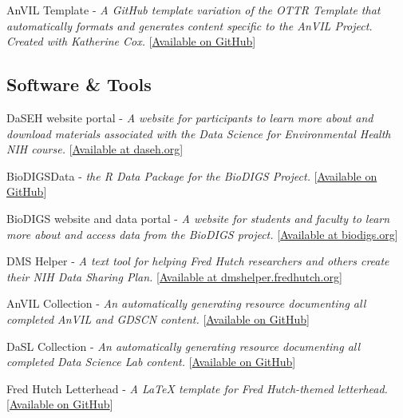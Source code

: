 \documentclass{cv}
\begin{document}
AnVIL Template - \textit{A GitHub template variation of the OTTR Template that automatically formats and generates content specific to the AnVIL Project. Created with Katherine Cox.} [\href{https://github.com/jhudsl/AnVIL_Template}{Available on GitHub}]

\subsection*{Software \& Tools}

DaSEH website portal - \textit{A website for participants to learn more about and download materials associated with the Data Science for Environmental Health NIH course.} [\href{https://daseh.org}{Available at daseh.org}]

BioDIGSData - \textit{the R Data Package for the BioDIGS Project.} [\href{https://github.com/fhdsl/BioDIGSData}{Available on GitHub}]

BioDIGS website and data portal - \textit{A website for students and faculty to learn more about and access data from the BioDIGS project.} [\href{https://biodigs.org}{Available at biodigs.org}]

DMS Helper - \textit{A text tool for helping Fred Hutch researchers and others create their NIH Data Sharing Plan.} [\href{https://dmshelper.fredhutch.org}{Available at dmshelper.fredhutch.org}]

AnVIL Collection - \textit{An automatically generating resource documenting all completed AnVIL and GDSCN content.} [\href{https://github.com/fhdsl/AnVIL_Collection}{Available on GitHub}]

DaSL Collection - \textit{An automatically generating resource documenting all completed Data Science Lab content.} [\href{https://github.com/fhdsl/DaSL_Collection}{Available on GitHub}]

Fred Hutch Letterhead - \textit{A LaTeX template for Fred Hutch-themed letterhead.} [\href{https://github.com/fhdsl/FH_letterhead}{Available on GitHub}]



\newpage
{}
\parttwo


\end{document}

